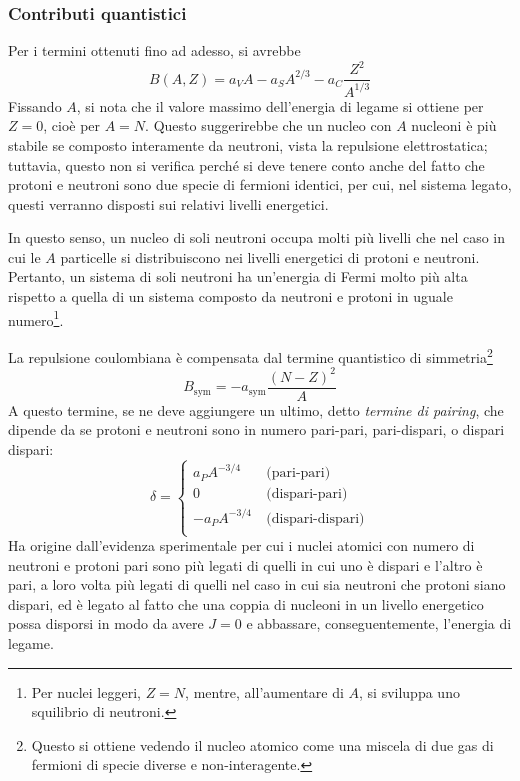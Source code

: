 \documentclass[11pt, a4paper]{scrartcl}
\theoremstyle{style}
\numberwithin{equation}{subsection}
\begin{document}
\subsubsection{Contributi quantistici}
Per i termini ottenuti fino ad adesso, si avrebbe
\[
B(A,Z) = a_V A - a_S A^{2 / 3} - a_C \frac{Z^2}{A^{1 / 3}}
\] 
Fissando $A$, si nota che il valore massimo dell'energia di legame si ottiene per $Z = 0$, cio\`e per $A = N$. 
Questo suggerirebbe che un nucleo con $A$ nucleoni \`e pi\`u stabile se composto interamente da neutroni, vista la repulsione elettrostatica; tuttavia, questo non si verifica perch\'e si deve tenere conto anche del fatto che protoni e neutroni sono due specie di fermioni identici, per cui, nel sistema legato, questi verranno disposti sui relativi livelli energetici.

In questo senso, un nucleo di soli neutroni occupa molti pi\`u livelli che nel caso in cui le $A$ particelle si distribuiscono nei livelli energetici di protoni e neutroni.
Pertanto, un sistema di soli neutroni ha un'energia di Fermi molto pi\`u alta rispetto a quella di un sistema composto da neutroni e protoni in uguale numero\footnote{Per nuclei leggeri, $Z = N$, mentre, all'aumentare di $A$, si sviluppa uno squilibrio di neutroni.}.

La repulsione coulombiana \`e compensata dal termine quantistico di simmetria\footnote{Questo si ottiene vedendo il nucleo atomico come una miscela di due gas di fermioni di specie diverse e non-interagente.} 
\begin{equation}
	B_\text{sym} = - a_\text{sym} \frac{(N-Z)^2}{A}
\end{equation}
A questo termine, se ne deve aggiungere un ultimo, detto \textit{termine di pairing}, che dipende da se protoni e neutroni sono in numero pari-pari, pari-dispari, o dispari dispari:
\begin{equation}
	\delta = \begin{cases}
		a_P A^{-3 / 4} &\ \text{(pari-pari)}\\
		0 &\ \text{(dispari-pari)}\\
		-a_P A^{-3 / 4} &\ \text{(dispari-dispari)}\\
	\end{cases}
\end{equation}
Ha origine dall'evidenza sperimentale per cui i nuclei atomici con numero di neutroni e protoni pari sono pi\`u legati di quelli in cui uno \`e dispari e l'altro \`e pari, a loro volta pi\`u legati di quelli nel caso in cui sia neutroni che protoni siano dispari, ed \`e legato al fatto che una coppia di nucleoni in un livello energetico possa disporsi in modo da avere $J=0$ e abbassare, conseguentemente, l'energia di legame. 
\end{document}
